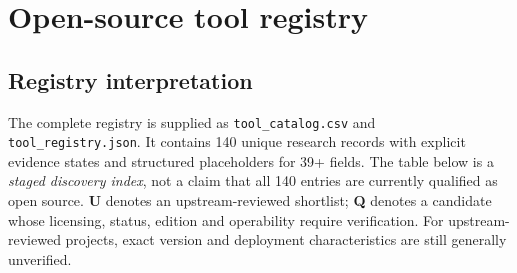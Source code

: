 \documentclass[11pt,oneside]{report}
\begin{document}
\chapter{Open-source tool registry}
\section{Registry interpretation}
The complete registry is supplied as \texttt{tool\_catalog.csv} and \texttt{tool\_registry.json}. It contains 140 unique research records with explicit evidence states and structured placeholders for 39+ fields. The table below is a \emph{staged discovery index}, not a claim that all 140 entries are currently qualified as open source. \textbf{U} denotes an upstream-reviewed shortlist; \textbf{Q} denotes a candidate whose licensing, status, edition and operability require verification. For upstream-reviewed projects, exact version and deployment characteristics are still generally unverified.
\end{document}
